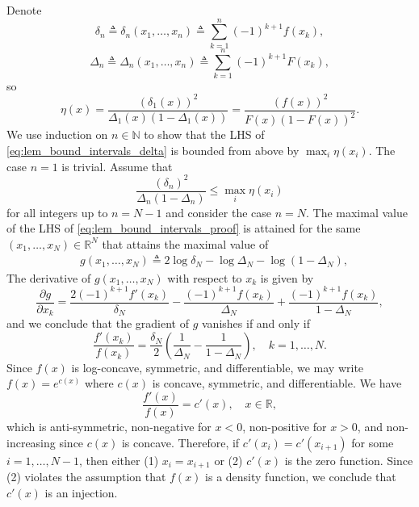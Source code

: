 \documentclass[letterpaper, 11pt]{IEEEtran}      %
\begin{document}
Denote 
\[
\delta_n \triangleq \delta_n(x_1,\ldots,x_n) \triangleq \sum_{k=1}^{n} (-1)^{k+1} f(x_k),
\]
\[
\Delta_n \triangleq \Delta_n(x_1,\ldots,x_n) \triangleq  \sum_{k=1}^n (-1)^{k+1} F(x_k),
\]
so 
\[
\eta(x) =  \frac{  \left(\delta_1(x) \right)^2}{\Delta_1(x)
(1-\Delta_1(x))}
= \frac{  \left( f (x) \right)^2}{ F(x)\left(1-F(x)\right)^2}. 
\]
We use induction on $n \in \mathbb N$ to show that the LHS of \eqref{eq:lem_bound_intervals_delta} is bounded from above by $\max_i \eta(x_i)$. The case $n=1$ is trivial. Assume that 
\begin{equation}
\frac{ \left( \delta_n \right)^2} 
{\Delta_n \left(1- \Delta_n \right) } \leq \max_i \eta(x_i)
\label{eq:lem_bound_intervals_proof}
\end{equation}
for all integers up to $n = N-1$ and consider the case $n = N$. 
%
The maximal value of the LHS of \eqref{eq:lem_bound_intervals_proof} is attained for the same $(x_1,\ldots,x_N) \in \mathbb R^N$ that attains the maximal value of 
\begin{align*}
& g(x_1,\ldots, x_N) \triangleq  2 \log \delta_N -  \log \Delta_N -  \log \left(1 - \Delta_N  \right),
\end{align*}
 The derivative of $g(x_1,\ldots,x_N)$ with respect to $x_k$ is given by
\[
\frac{\partial  g}{\partial x_k} = \frac{2 (-1)^{k+1} f'(x_k)}{\delta_N} -\frac{(-1)^{k+1} f(x_k)}{\Delta_N } + \frac{(-1)^{k+1} f(x_k)}{1-\Delta_N },
\]
and we conclude that the gradient of $g$ vanishes if and only if
\begin{equation}
\label{eq:gradient_zero}
\frac{f'(x_k)}{f(x_k)} = \frac{\delta_N}{2} \left( \frac{1}{\Delta_N} - \frac{1}{1-\Delta_N} \right),\quad k=1,\ldots,N.
\end{equation}
%
Since $f(x)$ is log-concave, symmetric, and differentiable, we may write $f(x) = e^{c(x)}$ where $c(x)$ is concave, symmetric, and differentiable. We have 
\[
\frac{f'(x)}{f(x)} = c'(x), \quad x\in \mathbb R,
\]
which is anti-symmetric, non-negative for $x<0$,  non-positive for $x>0$, and non-increasing since $c(x)$ is concave. Therefore, if $c'(x_i) = c'(x_{i+1})$ for some $i =1,\ldots,N-1$, then either (1) $x_i = x_{i+1}$ or (2) $c'(x)$ is the zero function. Since (2) violates the assumption that $f(x)$ is a density function, we conclude that $c'(x)$ is an injection. 
%
\end{document}
